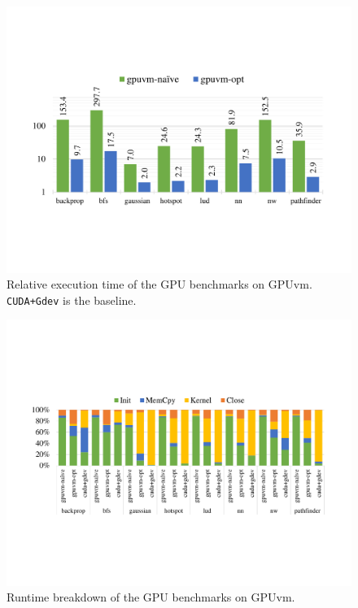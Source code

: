 \begin{figure}[!ht]
	\centering
	\hspace*{-0.75cm}\includegraphics[width=1.1\linewidth,trim={2.2cm 5.5cm 2.2cm 5cm},clip]{data/gpuvm/full-virt_time.pdf}
	\caption{{\footnotesize Relative execution time of the GPU benchmarks on GPUvm. \texttt{CUDA+Gdev} is the baseline.}}
	\label{fig_full-virt_time} \end{figure}

\begin{figure}[!ht]
	\centering
	\hspace*{-0.75cm}\includegraphics[width=1.1\linewidth,trim={2cm 5.5cm 2.1cm 6.0cm},clip]{data/gpuvm/full-virt_breakdown.pdf}
	\caption{{\footnotesize Runtime breakdown of the GPU benchmarks on GPUvm.}}
	\label{fig_full-virt_breakdown} \end{figure}

